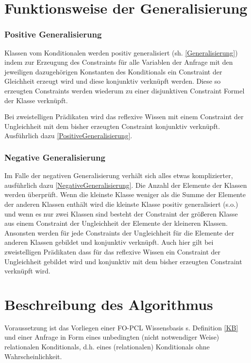 \documentclass[a4paper, 11pt]{book}
\begin{document}
\label{general}
\section{Funktionsweise der Generalisierung} 
\subsubsection{Positive Generalisierung} 
Klassen vom Konditionalen werden positiv generalisiert (sh. \ref{Generalisierung}) indem zur Erzeugung des Constraints für alle Variablen der Anfrage mit den jeweiligen dazugehörigen Konstanten des Konditionals ein Constraint der Gleichheit erzeugt wird und diese konjunktiv verknüpft werden. Diese so erzeugten Constraints werden wiederum zu einer disjunktiven Constraint Formel der Klasse verknüpft.{ Bei zweistelligen Prädikaten wird das reflexive Wissen mit einem Constraint der Ungleichheit mit dem bisher erzeugten Constraint konjunktiv verknüpft. Ausführlich dazu \ref{PositiveGeneralisierung}.
\subsubsection{Negative Generalisierung} 
Im Falle der negativen Generalisierung verhält sich alles etwas komplizierter, ausführlich dazu \ref{NegativeGeneralisierung}. Die Anzahl der Elemente der Klassen werden überprüft. Wenn die kleinste Klasse weniger als die Summe der Elemente der anderen Klassen enthält wird die kleinste Klasse positiv generalisiert (s.o.) und wenn es nur zwei Klassen sind besteht der Constraint der größeren Klasse aus einem Constraint der Ungleichheit der Elemente der kleineren Klassen. Ansonsten werden für jede Constraints der Ungleichheit für die Elemente der anderen Klassen gebildet und konjunktiv verknüpft. Auch hier gilt bei zweistelligen Prädikaten dass für das reflexive Wissen ein Constraint der Ungleichheit gebildet wird und konjunktiv mit dem bisher erzeugten Constraint verknüpft wird.



\section{Beschreibung des Algorithmus}
Voraussetzung ist das Vorliegen einer FO-PCL Wissensbasis  s. Definition \ref{KB} und einer Anfrage in Form eines unbedingten (nicht notwendiger Weise) relationalen Konditionals, d.h. eines (relationalen) Konditionals ohne Wahrscheinlichkeit.

}
\end{document}
